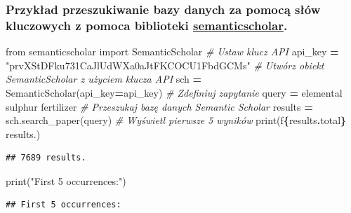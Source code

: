 \documentclass[
  12pt,
]{article}
\newenvironment{Shaded}{\begin{snugshade}}{\end{snugshade}}
\newcommand{\BuiltInTok}[1]{#1}
\newcommand{\CommentTok}[1]{\textcolor[rgb]{0.56,0.35,0.01}{\textit{#1}}}
\newcommand{\ImportTok}[1]{#1}
\newcommand{\NormalTok}[1]{#1}
\newcommand{\OperatorTok}[1]{\textcolor[rgb]{0.81,0.36,0.00}{\textbf{#1}}}
\newcommand{\SpecialCharTok}[1]{\textcolor[rgb]{0.81,0.36,0.00}{\textbf{#1}}}
\newcommand{\SpecialStringTok}[1]{\textcolor[rgb]{0.31,0.60,0.02}{#1}}
\newcommand{\StringTok}[1]{\textcolor[rgb]{0.31,0.60,0.02}{#1}}
\begin{document}
\hypertarget{przykux142ad-przeszukiwanie-bazy-danych-za-pomocux105-sux142uxf3w-kluczowych-z-pomoca-biblioteki-semanticscholar.}{%
\subsubsection{\texorpdfstring{Przykład przeszukiwanie bazy danych za
pomocą słów kluczowych z pomoca biblioteki
\href{https://pypi.org/project/semanticscholar/}{semanticscholar}.}{Przykład przeszukiwanie bazy danych za pomocą słów kluczowych z pomoca biblioteki semanticscholar.}}\label{przykux142ad-przeszukiwanie-bazy-danych-za-pomocux105-sux142uxf3w-kluczowych-z-pomoca-biblioteki-semanticscholar.}}

\begin{Shaded}
\begin{Highlighting}[]
\ImportTok{from}\NormalTok{ semanticscholar }\ImportTok{import}\NormalTok{ SemanticScholar}
\CommentTok{\# Ustaw klucz API}
\NormalTok{api\_key }\OperatorTok{=} \StringTok{"prvXStDFku731CaJlUdWXa0aJtFKCOCU1FbdGCMs"}
\CommentTok{\# Utwórz obiekt SemanticScholar z użyciem klucza API}
\NormalTok{sch }\OperatorTok{=}\NormalTok{ SemanticScholar(api\_key}\OperatorTok{=}\NormalTok{api\_key)}
\CommentTok{\# Zdefiniuj zapytanie}
\NormalTok{query }\OperatorTok{=} \StringTok{\textquotesingle{}elemental sulphur fertilizer\textquotesingle{}}
\CommentTok{\# Przeszukaj bazę danych Semantic Scholar}
\NormalTok{results }\OperatorTok{=}\NormalTok{ sch.search\_paper(query)}
\CommentTok{\# Wyświetl pierwsze 5 wyników}
\BuiltInTok{print}\NormalTok{(}\SpecialStringTok{f\textquotesingle{}}\SpecialCharTok{\{}\NormalTok{results}\SpecialCharTok{.}\NormalTok{total}\SpecialCharTok{\}}\SpecialStringTok{ results.\textquotesingle{}}\NormalTok{)}
\end{Highlighting}
\end{Shaded}

\begin{verbatim}
## 7689 results.
\end{verbatim}

\begin{Shaded}
\begin{Highlighting}[]
\BuiltInTok{print}\NormalTok{(}\StringTok{"First 5 occurrences:"}\NormalTok{)}
\end{Highlighting}
\end{Shaded}

\begin{verbatim}
## First 5 occurrences:
\end{verbatim}
\end{document}
